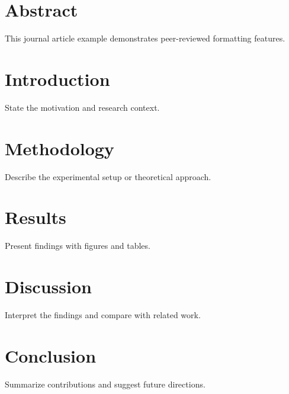 \documentclass[
    language=english,
    doctype=journal,
    institution=none,
    titlestyle=book,
]{../../omnilatex}
\begin{document}
\maketitle

\section*{Abstract}
This journal article example demonstrates peer-reviewed formatting features.

\tableofcontents

\section{Introduction}
State the motivation and research context.

\section{Methodology}
Describe the experimental setup or theoretical approach.

\section{Results}
Present findings with figures and tables.

\section{Discussion}
Interpret the findings and compare with related work.

\section{Conclusion}
Summarize contributions and suggest future directions.

\printbibliography
\end{document}
